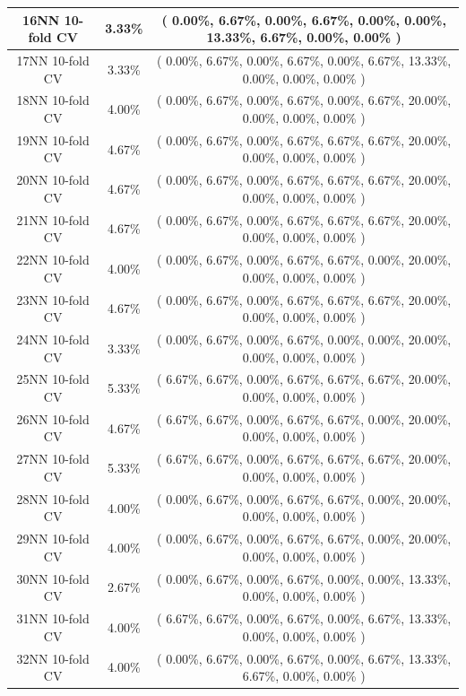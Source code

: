 \documentclass[11pt,a4paper]{article}
\begin{document}
\begin{center}
\begin{tabular} {|| c | c | c ||}
16NN 10-fold CV & 3.33\% & ( 0.00\%, 6.67\%, 0.00\%, 6.67\%, 0.00\%, 0.00\%, 13.33\%, 6.67\%, 0.00\%, 0.00\% ) \\ \hline
17NN 10-fold CV & 3.33\% & ( 0.00\%, 6.67\%, 0.00\%, 6.67\%, 0.00\%, 6.67\%, 13.33\%, 0.00\%, 0.00\%, 0.00\% ) \\ \hline
18NN 10-fold CV & 4.00\% & ( 0.00\%, 6.67\%, 0.00\%, 6.67\%, 0.00\%, 6.67\%, 20.00\%, 0.00\%, 0.00\%, 0.00\% ) \\ \hline
19NN 10-fold CV & 4.67\% & ( 0.00\%, 6.67\%, 0.00\%, 6.67\%, 6.67\%, 6.67\%, 20.00\%, 0.00\%, 0.00\%, 0.00\% ) \\ \hline
20NN 10-fold CV & 4.67\% & ( 0.00\%, 6.67\%, 0.00\%, 6.67\%, 6.67\%, 6.67\%, 20.00\%, 0.00\%, 0.00\%, 0.00\% ) \\ \hline
21NN 10-fold CV & 4.67\% & ( 0.00\%, 6.67\%, 0.00\%, 6.67\%, 6.67\%, 6.67\%, 20.00\%, 0.00\%, 0.00\%, 0.00\% ) \\ \hline
22NN 10-fold CV & 4.00\% & ( 0.00\%, 6.67\%, 0.00\%, 6.67\%, 6.67\%, 0.00\%, 20.00\%, 0.00\%, 0.00\%, 0.00\% ) \\ \hline
23NN 10-fold CV & 4.67\% & ( 0.00\%, 6.67\%, 0.00\%, 6.67\%, 6.67\%, 6.67\%, 20.00\%, 0.00\%, 0.00\%, 0.00\% ) \\ \hline
24NN 10-fold CV & 3.33\% & ( 0.00\%, 6.67\%, 0.00\%, 6.67\%, 0.00\%, 0.00\%, 20.00\%, 0.00\%, 0.00\%, 0.00\% ) \\ \hline
25NN 10-fold CV & 5.33\% & ( 6.67\%, 6.67\%, 0.00\%, 6.67\%, 6.67\%, 6.67\%, 20.00\%, 0.00\%, 0.00\%, 0.00\% ) \\ \hline
26NN 10-fold CV & 4.67\% & ( 6.67\%, 6.67\%, 0.00\%, 6.67\%, 6.67\%, 0.00\%, 20.00\%, 0.00\%, 0.00\%, 0.00\% ) \\ \hline
27NN 10-fold CV & 5.33\% & ( 6.67\%, 6.67\%, 0.00\%, 6.67\%, 6.67\%, 6.67\%, 20.00\%, 0.00\%, 0.00\%, 0.00\% ) \\ \hline
28NN 10-fold CV & 4.00\% & ( 0.00\%, 6.67\%, 0.00\%, 6.67\%, 6.67\%, 0.00\%, 20.00\%, 0.00\%, 0.00\%, 0.00\% ) \\ \hline
29NN 10-fold CV & 4.00\% & ( 0.00\%, 6.67\%, 0.00\%, 6.67\%, 6.67\%, 0.00\%, 20.00\%, 0.00\%, 0.00\%, 0.00\% ) \\ \hline
30NN 10-fold CV & 2.67\% & ( 0.00\%, 6.67\%, 0.00\%, 6.67\%, 0.00\%, 0.00\%, 13.33\%, 0.00\%, 0.00\%, 0.00\% ) \\ \hline
31NN 10-fold CV & 4.00\% & ( 6.67\%, 6.67\%, 0.00\%, 6.67\%, 0.00\%, 6.67\%, 13.33\%, 0.00\%, 0.00\%, 0.00\% ) \\ \hline
32NN 10-fold CV & 4.00\% & ( 0.00\%, 6.67\%, 0.00\%, 6.67\%, 0.00\%, 6.67\%, 13.33\%, 6.67\%, 0.00\%, 0.00\% ) \\ \hline

\end{tabular}
\end{center}
\end{document}
